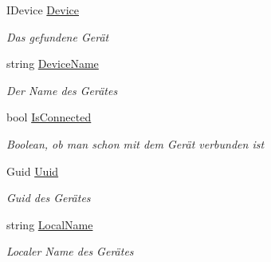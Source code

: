 \begin{DoxyCompactItemize}
\item 
I\+Device \mbox{\hyperlink{classmy_m_d_1_1_view_model_1_1_send_data_tab_view_model_1_1_scan_result_view_model_a46290df9ba85d55980f02b4569ac8649}{Device}}
\begin{DoxyCompactList}\small\item\em Das gefundene Gerät \end{DoxyCompactList}\item 
string \mbox{\hyperlink{classmy_m_d_1_1_view_model_1_1_send_data_tab_view_model_1_1_scan_result_view_model_a5fa7aaa6ca6d8d48917014cf1f99c091}{Device\+Name}}
\begin{DoxyCompactList}\small\item\em Der Name des Gerätes \end{DoxyCompactList}\item 
bool \mbox{\hyperlink{classmy_m_d_1_1_view_model_1_1_send_data_tab_view_model_1_1_scan_result_view_model_a24eabbd36d43371c325d58b12c64c19f}{Is\+Connected}}
\begin{DoxyCompactList}\small\item\em Boolean, ob man schon mit dem Gerät verbunden ist \end{DoxyCompactList}\item 
Guid \mbox{\hyperlink{classmy_m_d_1_1_view_model_1_1_send_data_tab_view_model_1_1_scan_result_view_model_a85f6973e1fc06fbbf200988d583fdb01}{Uuid}}
\begin{DoxyCompactList}\small\item\em Guid des Gerätes \end{DoxyCompactList}\item 
string \mbox{\hyperlink{classmy_m_d_1_1_view_model_1_1_send_data_tab_view_model_1_1_scan_result_view_model_ad98e9265244511282e9a84855021ab3e}{Local\+Name}}
\begin{DoxyCompactList}\small\item\em Localer Name des Gerätes \end{DoxyCompactList}\end{DoxyCompactItemize}


